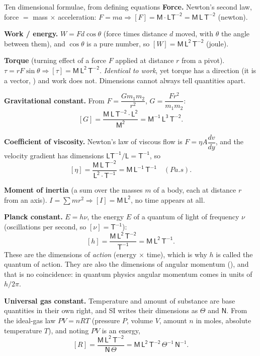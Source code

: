 \begin{derivbox}{Ten dimensional formulae, from defining equations}
 \textbf{Force.} Newton's second law, force $=$ mass $\times$ acceleration: $F=ma \Rightarrow [F]=\mathsf{M}\cdot\mathsf{LT^{-2}}
=\boxed{\mathsf{M\,L\,T^{-2}}}$ \;(newton).

 \textbf{Work / energy.} $W=Fd\cos\theta$ (force times distance $d$ moved, with $\theta$ the angle between them), and $\cos\theta$ is a pure number, so
$[W]=\boxed{\mathsf{M\,L^{2}\,T^{-2}}}$ \;(joule).

 \textbf{Torque} (turning effect of a force $F$ applied at distance $r$ from a pivot). $\tau=rF\sin\theta \Rightarrow [\tau]=\boxed{\mathsf{M\,L^{2}\,T^{-2}}}$.
\emph{Identical to work}, yet torque has a direction (it is a vector, ) and work does not. Dimensions cannot always tell
quantities apart.

 \textbf{Gravitational constant.} From $F=\dfrac{Gm_1m_2}{r^{2}}$, $G=\dfrac{Fr^{2}}{m_1m_2}$:
\[
[G]=\frac{\mathsf{M\,L\,T^{-2}}\cdot\mathsf{L^{2}}}{\mathsf{M^{2}}}
=\boxed{\mathsf{M^{-1}\,L^{3}\,T^{-2}}}.
\]

 \textbf{Coefficient of viscosity.} Newton's law of viscous flow is $F=\eta A\dfrac{dv}{dy}$, and
the velocity gradient has dimensions $\mathsf{LT^{-1}/L}=\mathsf{T^{-1}}$, so
\[
[\eta]=\frac{\mathsf{M\,L\,T^{-2}}}{\mathsf{L^{2}}\cdot\mathsf{T^{-1}}}
=\boxed{\mathsf{M\,L^{-1}\,T^{-1}}}\quad(\si{Pa.s}).
\]

 \textbf{Moment of inertia} (a sum over the masses $m$ of a body, each at distance $r$ from an axis). $I=\sum mr^{2}\Rightarrow[I]=\boxed{\mathsf{M\,L^{2}}}$, no time
appears at all.

 \textbf{Planck constant.} $E=h\nu$, the energy $E$ of a quantum of light of frequency $\nu$
(oscillations per second, so $[\nu]=\mathsf{T^{-1}}$):
\[
[h]=\frac{\mathsf{M\,L^{2}\,T^{-2}}}{\mathsf{T^{-1}}}=\boxed{\mathsf{M\,L^{2}\,T^{-1}}}.
\]
These are the dimensions of \emph{action} (energy $\times$ time), which is why $h$ is called the quantum
of action. They are also the dimensions of angular momentum (), and that is no
coincidence: in quantum physics angular momentum comes in units of $h/2\pi$.

 \textbf{Universal gas constant.} Temperature and amount of substance are base quantities in
their own right, and SI writes their dimensions as $\Theta$ and $\mathsf{N}$. From the ideal-gas law
$PV=nRT$ (pressure $P$, volume $V$, amount $n$ in moles, absolute temperature $T$), and noting
$PV$ is an energy,
\[
[R]=\frac{\mathsf{M\,L^{2}\,T^{-2}}}{\mathsf{N}\,\Theta}
=\boxed{\mathsf{M\,L^{2}\,T^{-2}}\,\Theta^{-1}\,\mathsf{N}^{-1}}.
\]


\end{derivbox}
